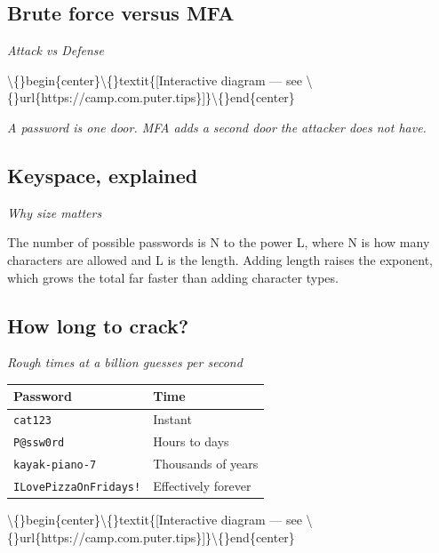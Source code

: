 \documentclass[12pt,openany]{book}
\begin{document}
\medskip

\subsection*{Brute force versus MFA}
{\small\itshape\color{gray}Attack vs Defense}

\textbackslash\{\}begin\{center\}\textbackslash\{\}textit\{[Interactive diagram --- see \textbackslash\{\}url\{https://camp.com.puter.tips\}]\}\textbackslash\{\}end\{center\}

{\small\itshape\color{gray}A password is one door. MFA adds a second door the attacker does not have.}

\medskip

\subsection*{Keyspace, explained}
{\small\itshape\color{gray}Why size matters}


The number of possible passwords is N to the power L, where N is how many characters are allowed and L is the length. Adding length raises the exponent, which grows the total far faster than adding character types.

\medskip

\subsection*{How long to crack?}
{\small\itshape\color{gray}Rough times at a billion guesses per second}


\begin{center}\small\begin{tabular}{p{6.5cm}p{6.5cm}}\toprule
\textbf{Password} & \textbf{Time} \\ \midrule
\texttt{cat123} & Instant \\
\texttt{P@ssw0rd} & Hours to days \\
\texttt{kayak-piano-7} & Thousands of years \\
\texttt{ILovePizzaOnFridays!} & Effectively forever \\
\bottomrule\end{tabular}\end{center}


\textbackslash\{\}begin\{center\}\textbackslash\{\}textit\{[Interactive diagram --- see \textbackslash\{\}url\{https://camp.com.puter.tips\}]\}\textbackslash\{\}end\{center\}

\medskip
\end{document}

